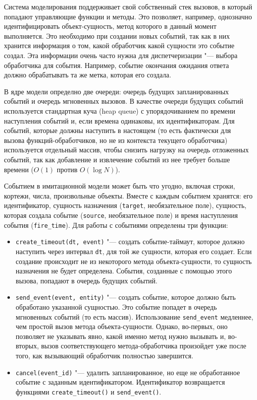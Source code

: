 Система моделирования поддерживает свой собственный стек вызовов, в который попадают управляющие функции и методы. Это позволяет, например, однозначно идентифицировать объект-сущность, метод которого в данный момент выполняется. Это необходимо при создании новых событий, так как в них хранится информация о том, какой обработчик какой сущности это событие создал. Эта информации очень часто нужна для диспетчеризации "--- выбора обработчика для события. Например, событие окончания ожидания ответа должно обрабатывать та же метка, которая его создала.

В ядре модели определно две очереди: очередь будущих запланированных событий и очередь мгновенных вызовов. В качестве очереди будущих событий используется стандартная куча (heap queue) с упорядочиванием по времени наступления событий и, если времена одинаковы, их идентификаторам. Для событий, которые должны наступить в настоящем (то есть фактически для вызова функций-обработчиков, но не из контекста текущего обработчика) используется отдельный массив, чтобы снизить нагрузку на очередь отложенных событий, так как добавление и извлечение событий из нее требует больше времени ($O(1)$ против $O(\log N)$).

Событием в имитационной модели может быть что угодно, включая строки, кортежи, числа, произвольные объекты. Вместе с каждым событием хранятся: его идентификатор, сущность назначения (\texttt{target}, необязательное поле), сущность, которая создала событие (\texttt{source}, необязательное поле) и время наступления события (\texttt{fire\_time}). Для работы с событиями определены три функции:

\begin{itemize}
\item \texttt{create\_timeout(dt, event)} "--- создать событие-таймаут, которое должно наступить через интервал \texttt{dt}, для той же сущности, которая его создает. Если создание происходит не из некоторого метода объекта-сущности, то сущность назначения не будет определена. События, созданные с помощью этого вызова, попадают в очередь будущих событий.
\item \texttt{send\_event(event, entity)} "--- создать событие, которое должно быть обработано указанной сущностью. Это событие попадет в очередь мгновенных событий (то есть массив). Использование \texttt{send\_event} медленнее, чем простой вызов метода объекта-сущности. Однако, во-первых, оно позволяет не указывать явно, какой именно метод нужно вызывать и, во-вторых, вызов соответствующего метода-обработчика произойдет уже после того, как вызывающий обработчик полностью завершится.
\item \texttt{cancel(event\_id)} "--- удалить запланированное, но еще не обработанное событие с заданным идентификатором. Идентификатор возвращается функциями \texttt{create\_timeout()} и \texttt{send\_event()}.
\end{itemize}

